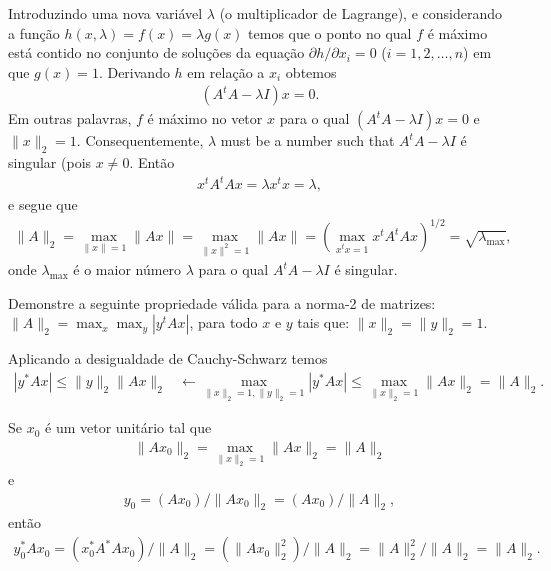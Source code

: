 \documentclass[a4paper,12pt, leqno, answers]{exam}
\begin{document}
\begin{questions}
\begin{solution}
        Introduzindo uma nova vari\'{a}vel $\lambda$ (o multiplicador de Lagrange), e considerando a fun\c{c}\~{a}o $h(x, \lambda) = f(x) = \lambda g(x)$ temos que o ponto no qual $f$ \'{e} m\'{a}ximo est\'{a} contido no conjunto de solu\c{c}\~{o}es da equa\c{c}\~{a}o $\partial h / \partial x_i = 0$ ($i = 1, 2, \ldots, n$) em que $g(x) = 1$. Derivando $h$ em rela\c{c}\~{a}o a $x_i$ obtemos
        \begin{align*}
            \left( A^t A - \lambda I \right) x = 0.
        \end{align*}
        Em outras palavras, $f$ \'{e} m\'{a}ximo no vetor $x$ para o qual $\left( A^t A - \lambda I \right) x = 0$  e $\| x \|_2 = 1$. Consequentemente, $\lambda$ must be a number such that $A^t A - \lambda I$ \'{e} singular (pois $x \neq 0$. Ent\~{a}o
        \begin{align*}
            x^t A^t A x = \lambda x^t x = \lambda,
        \end{align*}
        e segue que
        \begin{align*}
            \| A \|_2 = \max_{\| x \| = 1} \| A x \| = \max_{\| x \|^2 = 1} \| A x \| = \left( \max_{x^t x = 1} x^t A^t A x \right)^{1 / 2} = \sqrt{\lambda_{\max}},
        \end{align*}
        onde $\lambda_{\max}$ \'{e} o maior n\'{u}mero $\lambda$ para o qual $A^t A - \lambda I$ \'{e} singular.
    \end{solution}

     Demonstre a seguinte propriedade v\'{a}lida para a norma-2 de matrizes: $\| A \|_2 = \max_x \max_y | y^t A x |$, para todo $x$ e $y$ tais que: $\| x \|_2 = \| y \|_2 = 1$.
    \begin{solution}
        Aplicando a desigualdade de Cauchy-Schwarz temos
        \begin{align*}
            | y^* A x | \leq \| y \|_2 \| A x \|_2 &\leftarrow \max_{\| x \|_2 = 1, \| y \|_2 = 1} | y^* A x | \leq \max_{\| x \|_2 = 1} \| A x \|_2 = \| A \|_2.
        \end{align*}

        Se $x_0$ \'{e} um vetor unit\'{a}rio tal que
        \begin{align*}
            \| A x_0 \|_2 = \max_{\| x \|_2 = 1} \| A x \|_2 = \| A \|_2
        \end{align*}
        e
        \begin{align*}
            y_0 = \left( A x_0 \right) / \| A x_0 \|_2 = \left( A x_0 \right) / \| A \|_2,
        \end{align*}
        ent\~{a}o
        \begin{align*}
            y_0^* A x_0 = \left( x_0^* A^* A x_0 \right) / \| A \|_2 = \left( \| A x_0 \|_2^2 \right) / \| A \|_2 = \| A \|_2^2 / \| A \|_2 = \| A \|_2.
        \end{align*}
    \end{solution}


\end{questions}
\end{document}
